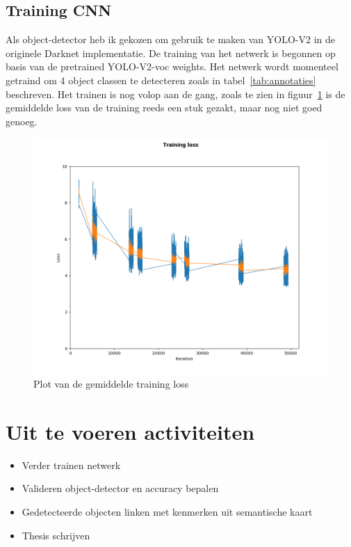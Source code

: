 \documentclass[11pt,a4paper]{article}
\begin{document}
        \subsection{Training CNN}
            Als object-detector heb ik gekozen om gebruik te maken van YOLO-V2 in de originele Darknet implementatie.
            De training van het netwerk is begonnen op basis van de pretrained YOLO-V2-voc weights. 
            Het netwerk wordt momenteel getraind om 4 object classen te detecteren zoals in tabel~\ref{tab:annotaties} beschreven. 
            Het trainen is nog volop aan de gang, zoals te zien in figuur~\ref{fig:training_loss} is de gemiddelde loss van de training reeds een stuk gezakt, maar nog niet goed genoeg.
        

            \begin{figure}[!htb]
                \centering
                \includegraphics[width=\linewidth]{training_loss_12_2.png}
                \caption{Plot van de gemiddelde training loss}
                \label{fig:training_loss}
            \end{figure}

    \section{Uit te voeren activiteiten}
        \begin{itemize}
            \item Verder trainen netwerk
            \item Valideren object-detector en accuracy bepalen
            \item Gedetecteerde objecten linken met kenmerken uit semantische kaart
            \item Thesis schrijven
        \end{itemize}

    
\end{document}
